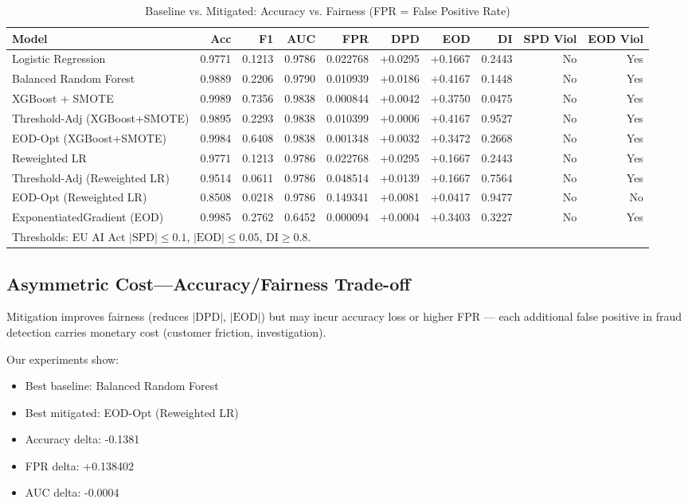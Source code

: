 \documentclass[conference]{IEEEtran}
\begin{document}
\begin{table}[!t]
\centering
\caption{Baseline vs. Mitigated: Accuracy vs. Fairness (FPR = False Positive Rate)}
\label{tab:mitigation}
\footnotesize
\begin{tabular}{@{}lrrrrrrrrr@{}}
\toprule
Model & Acc & F1 & AUC & FPR & DPD & EOD & DI & SPD Viol & EOD Viol \\
\midrule
Logistic Regression & 0.9771 & 0.1213 & 0.9786 & 0.022768 & +0.0295 & +0.1667 & 0.2443 & No & Yes \\
Balanced Random Forest & 0.9889 & 0.2206 & 0.9790 & 0.010939 & +0.0186 & +0.4167 & 0.1448 & No & Yes \\
XGBoost + SMOTE & 0.9989 & 0.7356 & 0.9838 & 0.000844 & +0.0042 & +0.3750 & 0.0475 & No & Yes \\
Threshold-Adj (XGBoost+SMOTE) & 0.9895 & 0.2293 & 0.9838 & 0.010399 & +0.0006 & +0.4167 & 0.9527 & No & Yes \\
EOD-Opt (XGBoost+SMOTE) & 0.9984 & 0.6408 & 0.9838 & 0.001348 & +0.0032 & +0.3472 & 0.2668 & No & Yes \\
Reweighted LR & 0.9771 & 0.1213 & 0.9786 & 0.022768 & +0.0295 & +0.1667 & 0.2443 & No & Yes \\
Threshold-Adj (Reweighted LR) & 0.9514 & 0.0611 & 0.9786 & 0.048514 & +0.0139 & +0.1667 & 0.7564 & No & Yes \\
EOD-Opt (Reweighted LR) & 0.8508 & 0.0218 & 0.9786 & 0.149341 & +0.0081 & +0.0417 & 0.9477 & No & No \\
ExponentiatedGradient (EOD) & 0.9985 & 0.2762 & 0.6452 & 0.000094 & +0.0004 & +0.3403 & 0.3227 & No & Yes \\
\bottomrule
\multicolumn{10}{l}{\scriptsize Thresholds: EU AI Act $|\mathrm{SPD}| \leq 0.1$, $|\mathrm{EOD}| \leq 0.05$, $\mathrm{DI} \geq 0.8$.}
\end{tabular}
\end{table}

\subsection{Asymmetric Cost---Accuracy/Fairness Trade-off}

Mitigation improves fairness (reduces $|\mathrm{DPD}|$, $|\mathrm{EOD}|$) but may incur accuracy loss or higher FPR — each additional false positive in fraud detection carries monetary cost (customer friction, investigation).

Our experiments show:

\begin{itemize}
\item Best baseline: Balanced Random Forest
\item Best mitigated: EOD-Opt (Reweighted LR)
\item Accuracy delta: -0.1381
\item FPR delta: +0.138402
\item AUC delta: -0.0004
\end{itemize}
\end{document}
